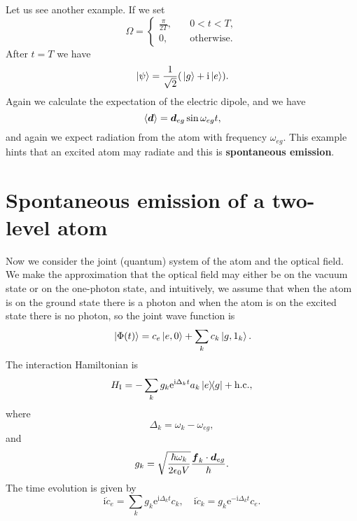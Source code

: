 \documentclass[hyperref, a4paper]{article}
\newcommand*{\ii}{\mathrm{i}}
\newcommand*{\ee}{\mathrm{e}}
\newcommand*{\concept}[1]{{\textbf{#1}}}
\begin{document}
Let us see another example. If we set 
\begin{equation}
    \Omega = \begin{cases}
        \frac{\pi}{2 T}, &\quad 0 < t < T, \\
        0,               &\quad \text{otherwise}.
    \end{cases}
\end{equation}
After $t = T$ we have 
\begin{equation}
    \ket*{\psi} = \frac{1}{\sqrt{2}} (\ket*{g} + \ii \ket*{e}).
\end{equation}
Again we calculate the expectation of the electric dipole, and we have 
\begin{equation}
    \expval*{\vb*{d}} = \vb*{d}_{eg} \sin \omega_{eg} t,
\end{equation}
and again we expect radiation from the atom with frequency $\omega_{eg}$.
This example hints that an excited atom may radiate and this is \concept{spontaneous emission}.

\section{Spontaneous emission of a two-level atom}

Now we consider the joint (quantum) system of the atom and the optical field.
We make the approximation that the optical field may either be on the vacuum state or on the one-photon state, 
and intuitively, we assume that when the atom is on the ground state there is a photon and when the atom is 
on the excited state there is no photon, so the joint wave function is
\begin{equation}
    \ket*{\Phi(t)} = c_e \ket*{e, 0} + \sum_{k} c_k \ket*{g, 1_k}.
\end{equation}
The interaction Hamiltonian is 
\begin{equation}
    H_\text{I} = - \sum_k g_k \ee^{\ii \Delta_k t} a_k \dyad*{e}{g} + \text{h.c.},
\end{equation}
where 
\begin{equation}
    \Delta_k = \omega_k - \omega_{eg},
\end{equation}
and
\begin{equation}
    g_k = \sqrt{\frac{\hbar \omega_k}{2 \epsilon_0 V}} \frac{\vb*{f}_k \cdot \vb*{d}_{eg}}{\hbar}.
\end{equation}
The time evolution is given by
\begin{equation}
    \ii \dot{c}_e = \sum_k g_k \ee^{\ii \Delta_k t} c_k, \quad \ii \dot{c}_k = g_k \ee^{- \ii \Delta_k t} c_e.
\end{equation}
\end{document}
